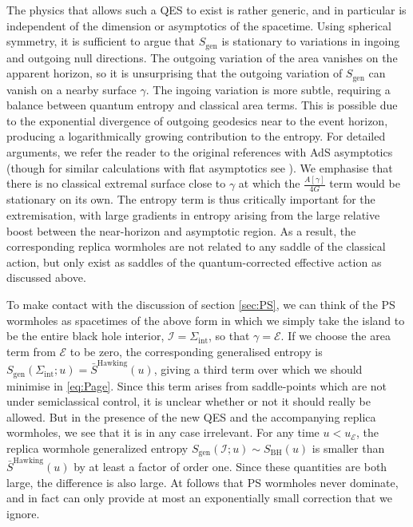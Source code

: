 \documentclass[letterpaper,12pt]{article}
\newcommand*{\evap}{\mathscr{E}} %
\newcommand*{\island}{\mathcal{I}}
\begin{document}
The physics that allows such a QES to exist is rather generic, and in particular is independent of the dimension or asymptotics of the spacetime. Using spherical symmetry, it is sufficient to argue that $S_\mathrm{gen}$ is stationary to variations in ingoing and outgoing null directions. The outgoing variation of the area vanishes on the apparent horizon, so it is unsurprising that the outgoing variation of $S_\mathrm{gen}$ can vanish on a nearby surface $\gamma$. The ingoing variation is more subtle, requiring a balance between quantum entropy and classical area terms. This is possible due to the exponential divergence of outgoing geodesics near to the event horizon, producing a logarithmically growing contribution to the entropy. For detailed arguments, we refer the reader to the original references \cite{Penington:2019npb,Almheiri:2019psf} with AdS asymptotics (though for similar calculations with flat asymptotics see \cite{Hartman:2020swn,Gautason:2020tmk,Anegawa:2020ezn,Krishnan:2020oun,Hashimoto:2020cas}). We emphasise that there is no classical extremal surface close to $\gamma$ at which the $\frac{A[\gamma ]}{4G}$ term would be stationary on its own. The entropy term is thus critically important for the extremisation, with large gradients in entropy arising from the large relative boost between the near-horizon and asymptotic region. As a result, the corresponding replica wormholes are not related to any saddle of the classical action, but only exist as saddles of the quantum-corrected effective action as discussed above.

To make contact with the discussion of section \ref{sec:PS}, we can think of the PS wormholes as spacetimes of the above form in which we simply take the island to be the entire black hole interior, $\island = \Sigma_\mathrm{int}$, so that $\gamma=\evap$. If we choose the area term from $\evap$ to be zero, the corresponding generalised entropy is  $S_\mathrm{gen}(\Sigma_\mathrm{int};u) = \bar{S}^\mathrm{Hawking}(u)$, giving a third term over which we should minimise in \eqref{eq:Page}. Since this term arises from saddle-points which are not under semiclassical control, it is unclear whether or not it should really be allowed. But in the presence of the new QES and the accompanying replica wormholes, we see that it is in any case irrelevant. For any time $u< u_\evap$, the replica wormhole generalized entropy $S_\mathrm{gen}(\island;u)\sim S_\mathrm{BH}(u)$ is smaller than $\bar{S}^\mathrm{Hawking}(u)$ by  at least a factor of order one.  Since these quantities are both large, the difference is also large. At follows that PS wormholes never dominate, and in fact can only provide at most an exponentially small correction that we ignore.
\end{document}
